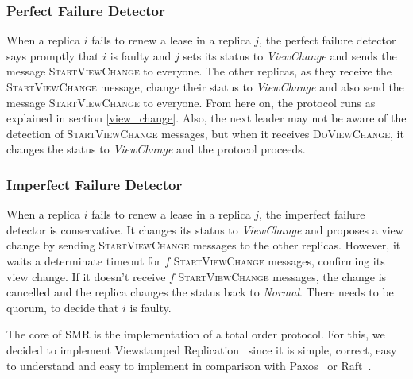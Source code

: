 \documentclass[times, 10pt,twocolumn]{article}
\begin{document}
\subsubsection{Perfect Failure Detector} \label{pfd}
When a replica $i$ fails to renew a lease in a replica $j$, the perfect failure detector 
says promptly that $i$ is faulty and $j$ sets its status to \textit{ViewChange} and sends the message
\textsc{StartViewChange} to everyone. The other replicas, as they receive the 
\textsc{StartViewChange} message, change their status to \textit{ViewChange} and also send the message
\textsc{StartViewChange} to everyone. From here on, the protocol runs as explained in 
section \ref{view_change}. Also, the next leader may not be aware of the detection of 
\textsc{StartViewChange} messages, but when it receives \textsc{DoViewChange}, it changes the status to
\textit{ViewChange} and the protocol proceeds.

\subsubsection{Imperfect Failure Detector} \label{ifd}
When a replica $i$ fails to renew a lease in a replica $j$, the imperfect failure detector
is conservative. It changes its status to \textit{ViewChange} and proposes a view change by sending
\textsc{StartViewChange} messages to the other replicas. However, it waits a determinate timeout for $f$ \textsc{StartViewChange} messages, confirming its view change. If it doesn't receive $f$ \textsc{StartViewChange} messages,
the change is cancelled and the replica changes the status back to \textit{Normal}. There needs to be quorum, to decide that
$i$ is faulty.

 \label{smr}
The core of SMR is the implementation of a total order protocol. For this, we decided
to implement Viewstamped Replication~\cite{Oki:1988:VRN:62546.62549} since it is simple, 
correct, easy to understand and easy to implement in comparison with Paxos~\cite{Lamport:1998:PP:279227.279229} 
or Raft~\cite{Ongaro:2014:SUC:2643634.2643666}.
\end{document}
